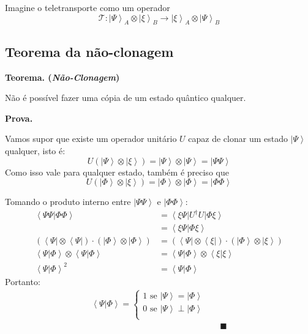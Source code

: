 \documentclass[t]{beamer}
\newcommand{\teorema}[1]{%
	\textbf{Teorema. (\emph{#1})\\}
}
\newcommand{\prova}{%
	\textbf{Prova.\\}
}
\newcommand{\cqd}{\blacksquare}
\newcommand{\ket}[1]{\ensuremath{\left|#1\right\rangle}}
\newcommand{\bra}[1]{\ensuremath{\left\langle#1\right|}}
\newcommand{\braket}[2]{\ensuremath{\left\langle#1|#2\right\rangle}}
\begin{document}
	\begin{frame}{\subsecname}
	
		Imagine o teletransporte como um operador 
		$$\mathcal{T} : \ket{\Psi}_A \otimes \ket{\xi}_B \to \ket{\xi}_A \otimes \ket{\Psi}_B$$
	
	\end{frame}
	
	\subsection{Teorema da não-clonagem}
	
	
	\begin{frame}{\subsecname}
	
	\teorema{Não-Clonagem}
		Não é possível fazer uma cópia de um estado quântico qualquer.

	\prova
	Vamos supor que existe um operador unitário $U$ capaz de clonar um estado $\ket{\Psi}$ qualquer, isto é:
		$$U (\ket{\Psi} \otimes \ket{\xi}) = \ket{\Psi} \otimes \ket{\Psi} = \ket{\Psi\Psi}$$
	Como isso vale para qualquer estado, também é preciso que
		$$U (\ket{\Phi} \otimes \ket{\xi}) = \ket{\Phi} \otimes \ket{\Phi} = \ket{\Phi\Phi}$$
	\end{frame}
	
	\begin{frame}{\subsecname}
		Tomando o produto interno entre $\ket{\Psi\Psi}$ e $\ket{\Phi\Phi}$:
		\begin{align*}
		\braket{\Psi\Psi}{\Phi\Phi} &= \bra{\xi\Psi}U^{\dagger} U \ket{\Phi\xi}\\
		&= \braket{\xi\Psi}{\Phi\xi}\\
		(\bra{\Psi} \otimes \bra{\Psi}) \cdot (\ket{\Phi} \otimes \ket{\Phi}) &= (\bra{\Psi} \otimes \bra{\xi}) \cdot (\ket{\Phi} \otimes \ket{\xi})\\
		\braket{\Psi}{\Phi} \otimes \braket{\Psi}{\Phi} &= \braket{\Psi}{\Phi} \otimes \braket{\xi}{\xi}\\
		\braket{\Psi}{\Phi}^2 &= \braket{\Psi}{\Phi}
		\end{align*}
		Portanto:
		\begin{align*}
			\braket{\Psi}{\Phi} = \begin{cases}
			1 \text{ se } \ket{\Psi} = \ket{\Phi}\\
			0 \text{ se } \ket{\Psi} \perp \ket{\Phi}\\
			\end{cases}\\
		&& \cqd
		\end{align*}
	\end{frame}
	
\end{document}
